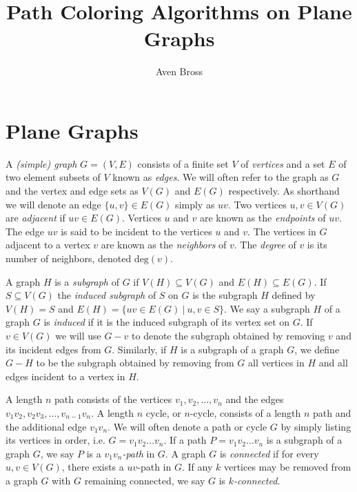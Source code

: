 \documentclass[letterpaper, 12pt]{amsart}
\title{Path Coloring Algorithms on Plane Graphs}
\author{Aven Bross}
\theoremstyle{definition}
\theoremstyle{definition}
\theoremstyle{thm}
\theoremstyle{definition}
\begin{document}
\maketitle

\section{Plane Graphs}

A \textit{(simple) graph} $G=(V,E)$ consists of a finite set $V$ of
\textit{vertices} and a set $E$ of two element subsets of $V$ known as
\textit{edges}. We will often refer to the graph as $G$ and the vertex and
edge sets as $V(G)$ and $E(G)$ respectively. As shorthand we will denote an edge
$\{u,v\}\in E(G)$ simply as $uv$. Two vertices $u,v\in V(G)$ are
\textit{adjacent} if $uv\in E(G)$. Vertices $u$ and $v$ are known as the
\textit{endpoints} of $uv$. The edge $uv$ is said to be incident to the vertices
$u$ and $v$. The vertices in $G$ adjacent to a vertex $v$ are known as
the \textit{neighbors} of $v$. The \textit{degree} of $v$ is its number of
neighbors, denoted $\text{deg}(v)$.

A graph $H$ is a \textit{subgraph} of $G$ if $V(H)\subseteq V(G)$ and
$E(H)\subseteq E(G)$. If $S\subseteq V(G)$ the \textit{induced subgraph} of
$S$ on $G$ is the subgraph $H$ defined by $V(H)=S$ and
$E(H)=\{uv\in E(G) \ | \ u,v\in S\}$. We say a subgraph $H$ of a graph $G$ is
\textit{induced} if it is the induced subgraph of its vertex set on $G$. If
$v\in V(G)$ we will use $G-v$ to denote the subgraph obtained by removing $v$
and its incident edges from $G$. Similarly, if $H$ is a subgraph of a graph $G$,
we define $G-H$ to be the subgraph obtained by removing from $G$ all vertices in
$H$ and all edges incident to a vertex in $H$.

A length $n$ path consists of the vertices $v_1,v_2,\ldots,v_n$ and the edges
$v_1v_2,v_2v_3,\ldots,v_{n-1}v_n$. A length $n$ cycle, or $n$-cycle, consists of
a length $n$ path and the additional edge $v_1v_n$. We will often denote a path
or cycle $G$ by simply listing its vertices in order, i.e. $G=v_1v_2\ldots v_n$.
If a path $P=v_1v_2\ldots v_n$ is a subgraph of a graph $G$, we say $P$ is a
\textit{$v_1v_n$-path} in $G$. A graph $G$ is \textit{connected} if for every
$u,v\in V(G)$, there exists a $uv$-path in $G$. If any $k$ vertices may be
removed from a graph $G$ with $G$ remaining connected, we say $G$ is
\textit{$k$-connected}.
\end{document}
